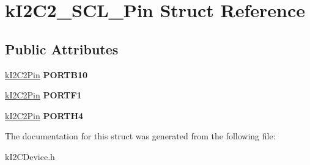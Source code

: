 \hypertarget{structkI2C2__SCL__Pin}{}\section{k\+I2\+C2\+\_\+\+S\+C\+L\+\_\+\+Pin Struct Reference}
\label{structkI2C2__SCL__Pin}
\subsection*{Public Attributes}
\begin{DoxyCompactItemize}
\item 
\hyperlink{structkI2C2Pin}{k\+I2\+C2\+Pin} {\bfseries P\+O\+R\+T\+B10}\hypertarget{structkI2C2__SCL__Pin_afa10933edaab723e127a2d115a920d0b}{}\label{structkI2C2__SCL__Pin_afa10933edaab723e127a2d115a920d0b}

\item 
\hyperlink{structkI2C2Pin}{k\+I2\+C2\+Pin} {\bfseries P\+O\+R\+T\+F1}\hypertarget{structkI2C2__SCL__Pin_ad6d5dae9cc4cbb930b73bd6175ae8e58}{}\label{structkI2C2__SCL__Pin_ad6d5dae9cc4cbb930b73bd6175ae8e58}

\item 
\hyperlink{structkI2C2Pin}{k\+I2\+C2\+Pin} {\bfseries P\+O\+R\+T\+H4}\hypertarget{structkI2C2__SCL__Pin_ab260b3448820d5eabb951a78f0fe10db}{}\label{structkI2C2__SCL__Pin_ab260b3448820d5eabb951a78f0fe10db}

\end{DoxyCompactItemize}


The documentation for this struct was generated from the following file\+:\begin{DoxyCompactItemize}
\item 
k\+I2\+C\+Device.\+h\end{DoxyCompactItemize}
